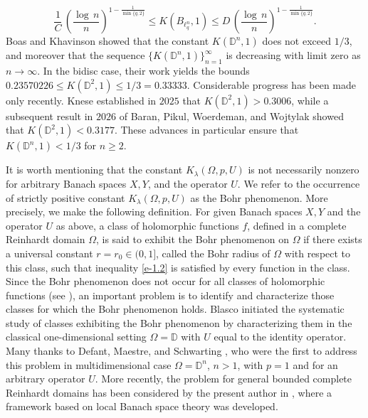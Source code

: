 \documentclass[a4paper,11pt, reqno]{amsart}
\theoremstyle{definition}
\begin{document}
	\begin{equation*}
		\frac{1}{C}\, \left(\frac{\log\,n}{n}\right)^{1-\frac{1}{\min\{q,2\}}} \leq K(B_{\ell^n _q},1) \leq D \,\left(\frac{\log\,n}{n}\right)^{1-\frac{1}{\min\{q,2\}}}.
	\end{equation*}
Boas and Khavinson \cite{boas-1997} showed that the constant $K(\mathbb{D}^n,1)$ does not exceed $ 1/3$, and moreover that the sequence $\{K(\mathbb{D}^n,1)\}_{n=1}^{\infty}$ is decreasing with limit zero as $n \rightarrow \infty$. In the bidisc case, their work yields the bounds $0.23570226\leq K(\mathbb{D}^2,1) \leq 1/3=0.33333$. Considerable progress has been made only recently. Knese \cite{knese-2025} established in $2025$ that $K(\mathbb{D}^2,1)>0.3006$, while a subsequent result in $2026$ of Baran, Pikul, Woerdeman, and Wojtylak \cite{baran-2026} showed that $K(\mathbb{D}^2,1) < 0.3177$. These advances in particular ensure that $K(\mathbb{D}^n,1) <1/3$ for $n \geq 2$.
	\vspace{1mm}
	
    It is worth mentioning that the constant $K_{\lambda}(\Omega, p,U)$ is not necessarily nonzero for arbitrary Banach spaces $X,Y$, and the operator $U$. We refer to the occurrence of strictly positive constant $K_{\lambda}(\Omega, p,U)$ as the Bohr phenomenon. More precisely, we make the following definition. For given Banach spaces $X,Y$ and the operator $U$ as above, a class of holomorphic functions $f$, defined in a complete Reinhardt domain $\Omega$, is said to exhibit the Bohr phenomenon on $\Omega$ if there exists a universal constant $r=r_{0}\in (0,1]$, called the Bohr radius of $\Omega$ with respect to this class, such that inequality \eqref{e-1.2} is satisfied by every function in the class. Since the Bohr phenomenon does not occur for all classes of holomorphic functions (see \cite{aizn-2000b,Himadri-Vasu-PEMS,bene-2004,Blasco-Collect-2017}), an important problem is to identify and characterize those classes for which the Bohr phenomenon holds. Blasco \cite{Blasco-Collect-2017} initiated the systematic study of classes exhibiting the Bohr phenomenon by characterizing them in the classical one-dimensional setting $\Omega=\mathbb{D}$ with $U$ equal to the identity operator. Many thanks to Defant, Maestre, and Schwarting \cite{defant-2012}, who were the first to address this problem in multidimensional case $\Omega=\mathbb{D}^n$, $n>1$, with $p=1$ and for an arbitrary operator $U$. More recently, the problem for general bounded complete Reinhardt domains has been considered by the present author in \cite{Himadri-local-Banach-1}, where a framework based on local Banach space theory was developed.
    \vspace{2mm}
    
\end{document}
